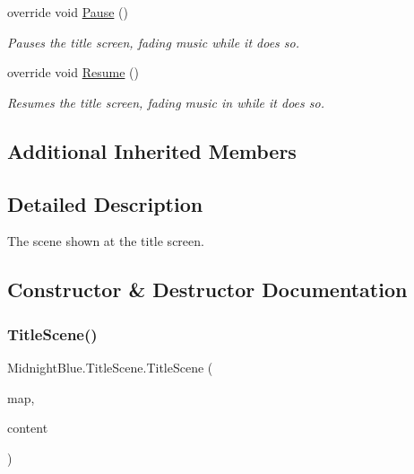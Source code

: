 \begin{DoxyCompactItemize}
override void \hyperlink{class_midnight_blue_1_1_title_scene_a046934bfa3290d443b58bcc1de0919db}{Pause} ()
\begin{DoxyCompactList}\small\item\em Pauses the title screen, fading music while it does so. \end{DoxyCompactList}\item 
override void \hyperlink{class_midnight_blue_1_1_title_scene_afb0bb3ad8b2766b5d57537dc1ef22249}{Resume} ()
\begin{DoxyCompactList}\small\item\em Resumes the title screen, fading music in while it does so. \end{DoxyCompactList}\end{DoxyCompactItemize}
\subsection*{Additional Inherited Members}


\subsection{Detailed Description}
The scene shown at the title screen. 



\subsection{Constructor \& Destructor Documentation}
\hypertarget{class_midnight_blue_1_1_title_scene_a409eb89a58dbec10d5a0002ce78bc9a3}{}\label{class_midnight_blue_1_1_title_scene_a409eb89a58dbec10d5a0002ce78bc9a3} 
\subsubsection{\texorpdfstring{Title\+Scene()}{TitleScene()}}
{\footnotesize\ttfamily Midnight\+Blue.\+Title\+Scene.\+Title\+Scene (\begin{DoxyParamCaption}\item[{\hyperlink{class_midnight_blue_1_1_engine_1_1_entity_component_1_1_entity_map}{Entity\+Map}}]{map,  }\item[{Content\+Manager}]{content }\end{DoxyParamCaption})\hspace{0.3cm}{\ttfamily [inline]}}



